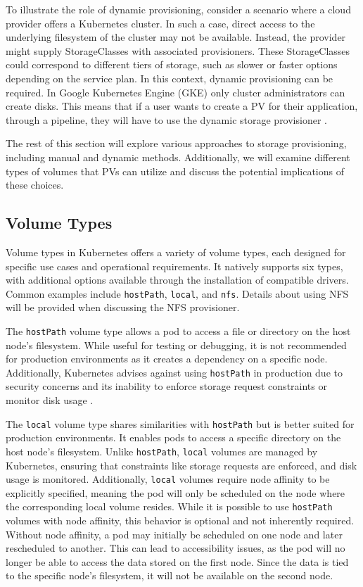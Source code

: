 To illustrate the role of dynamic provisioning, consider a scenario where a cloud provider offers a Kubernetes cluster. In such a case, direct access to the underlying filesystem of the cluster may not be available. Instead, the provider might supply StorageClasses with associated provisioners. These StorageClasses could correspond to different tiers of storage, such as slower or faster options depending on the service plan. In this context, dynamic provisioning can be required. In Google Kubernetes Engine (GKE) only cluster administrators can create disks. This means that if a user wants to create a PV for their application, through a pipeline, they will have to use the dynamic storage provisioner \Parencite{googlek8spv}. 

The rest of this section will explore various approaches to storage provisioning, including manual and dynamic methods. Additionally, we will examine different types of volumes that PVs can utilize and discuss the potential implications of these choices.

\subsection{Volume Types} 
Volume types in Kubernetes offers a variety of volume types, each designed for specific use cases and operational requirements. It natively supports six types, with additional options available through the installation of compatible drivers. Common examples include \texttt{hostPath}, \texttt{local}, and \texttt{nfs}. Details about using NFS will be provided when discussing the NFS provisioner.

The \texttt{hostPath} volume type allows a pod to access a file or directory on the host node's filesystem. While useful for testing or debugging, it is not recommended for production environments as it creates a dependency on a specific node. Additionally, Kubernetes advises against using \texttt{hostPath} in production due to security concerns and its inability to enforce storage request constraints or monitor disk usage \Parencite{kubernetes_hostpath}.

The \texttt{local} volume type shares similarities with \texttt{hostPath} but is better suited for production environments. It enables pods to access a specific directory on the host node's filesystem. Unlike \texttt{hostPath}, \texttt{local} volumes are managed by Kubernetes, ensuring that constraints like storage requests are enforced, and disk usage is monitored. Additionally, \texttt{local} volumes require node affinity to be explicitly specified, meaning the pod will only be scheduled on the node where the corresponding local volume resides. While it is possible to use \texttt{hostPath} volumes with node affinity, this behavior is optional and not inherently required. Without node affinity, a pod may initially be scheduled on one node and later rescheduled to another. This can lead to accessibility issues, as the pod will no longer be able to access the data stored on the first node. Since the data is tied to the specific node's filesystem, it will not be available on the second node. 

